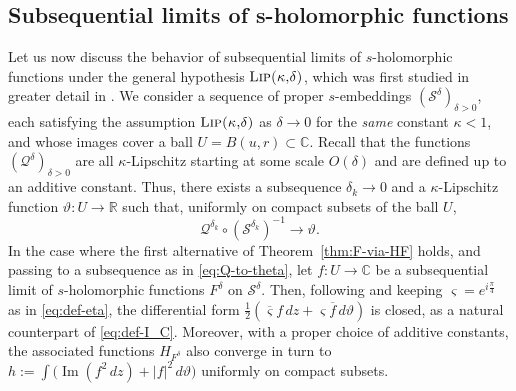 \documentclass[reqno]{amsart}
\numberwithin{equation}{section}
\theoremstyle{definition}
\theoremstyle{remark}
\newcommand\C{\mathbb{C}}
\newcommand\R{\mathbb{R}}
\renewcommand\Im{\operatorname{Im}}
\newcommand\cQ{\mathcal{Q}}
\newcommand\cS{\mathcal{S}}
\def\LipKd{{\mbox{\textsc{Lip(}$\kappa$\textsc{,}$\delta$\textsc{)}}}}
\begin{document}
\subsection{Subsequential limits of s-holomorphic functions} \label{sub:shol-limits}
Let us now discuss the behavior of subsequential limits of $s$-holomorphic functions under the general hypothesis $\LipKd$, which was first studied in greater detail in \cite[Section~2.7]{Che20}. We consider a sequence of proper $s$-embeddings $(\cS^\delta)_{\delta > 0}$, each satisfying the assumption $\LipKd$ as $\delta \to 0$ for the \emph{same} constant $\kappa < 1$, and whose images cover a ball $U = B(u, r) \subset \C$. Recall that the functions $(\cQ^{\delta})_{\delta > 0}$ are all $\kappa$-Lipschitz starting at some scale $O(\delta)$ and are defined up to an additive constant. Thus, there exists a subsequence $\delta_k \to 0$ and a $\kappa$-Lipschitz function $\vartheta : U \to \R$ such that, uniformly on compact subsets of the ball $U$,
\begin{equation}
\label{eq:Q-to-theta}
\cQ^{\delta_{k}}\circ (\cS^{\delta_{k}})^{-1}\to\vartheta.
\end{equation}
In the case where the first alternative of Theorem~\ref{thm:F-via-HF} holds, and passing to a subsequence as in \eqref{eq:Q-to-theta}, let $f : U \to \C$ be a subsequential limit of $s$-holomorphic functions $F^\delta$ on $\cS^\delta$. Then, following \cite[Proposition~2.21]{Che20} and keeping $\varsigma = e^{i\frac{\pi}{4}}$ as in \eqref{eq:def-eta}, the differential form $\tfrac{1}{2}(\overline{\varsigma} f\, dz + \varsigma \overline{f}\, d\vartheta)$ is closed, as a natural counterpart of \eqref{eq:def-I_C}. Moreover, with a proper choice of additive constants, the associated functions $H_{F^\delta}$ also converge in turn to 
    $h := \int \big( \Im(f^2\, dz) + |f|^2\, d\vartheta \big)$ uniformly on compact subsets.
\end{document}
